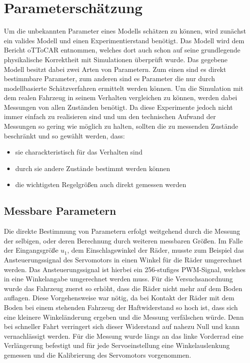 \section{Parameterschätzung}
Um die unbekannten Parameter eines Modells schätzen zu können, wird zunächst ein valides Modell und einen Experimentierstand benötigt. Das Modell wird dem Bericht oTToCAR \cite[Seite 12]{VikAnd} entnommen, welches dort auch schon auf seine grundlegende physikalische Korrektheit mit Simulationen überprüft wurde. Das gegebene Modell besitzt dabei zwei Arten von Parametern. Zum einen sind es direkt bestimmbare Parameter, zum anderen sind es Parameter die nur durch modellbasierte Schätzverfahren ermittelt werden können. Um die Simulation mit dem realen Fahrzeug in seinem Verhalten vergleichen zu können, werden dabei Messungen von allen Zuständen benötigt. Da diese Experimente jedoch nicht immer einfach zu realisieren sind und um den technischen Aufwand der Messungen so gering wie möglich zu halten, sollten die zu messenden Zustände beschränkt und so gewählt werden, dass:    
\begin{itemize}
	\item sie charackteristisch für das Verhalten sind
	\item durch sie andere Zustände bestimmt werden können
	\item die wichtigsten Regelgrößen auch direkt gemessen werden
\end{itemize}

\subsection{Messbare Parametern}
Die direkte Bestimmung von Parametern erfolgt weitgehend durch die Messung der selbigen, oder deren Berechnung durch weiteren messbaren Größen. Im Falle der Eingangsgröße $u_{1}$, dem Einschlagswinkel der Räder, musste zum Beispiel das Ansteuerungssignal des Servomotors in einen Winkel für die Räder umgerechnet werden. Das Ansteuerungssignal ist hierbei ein 256-stufiges PWM-Signal, welches in eine Winkelangabe umgerechnet werden muss. Für die Versuchsanordnung wurde das Fahrzeug zuerst so erhöht, dass die Räder nicht mehr auf dem Boden auflagen. Diese Vorgehensweise war nötig, da bei Kontakt der Räder mit dem Boden bei einem stehenden Fahrzeug der Haftwiderstand so hoch ist, dass sich eine kleinere Winkeländerung ergeben und die Messung verfälschen würde. Denn bei schneller Fahrt verringert sich dieser Widerstand auf nahezu Null und kann vernachlässigt werden. Für die Messung wurde längs an das linke Vorderrad eine Verlängerung befestigt und für jede Servoeinstellung eine Winkelauslenkung gemessen und die Kalibrierung des Servomotors vorgenommen. 

